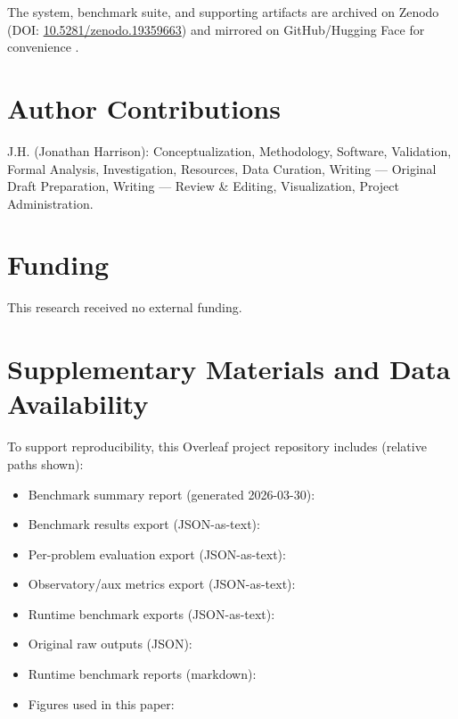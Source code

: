 \documentclass[11pt,a4paper]{article}
\begin{document}
The system, benchmark suite, and supporting artifacts are archived on Zenodo (DOI: \href{https://doi.org/10.5281/zenodo.19359663}{10.5281/zenodo.19359663}) and mirrored on GitHub/Hugging Face for convenience \citep{harrison2026codettezenodo,codetteReasoningWiki,codetteTrainingLab,codetteTrainingLabHF,codetteReasoningHF}.

\section*{Author Contributions}

J.H. (Jonathan Harrison): Conceptualization, Methodology, Software, Validation, Formal Analysis, Investigation, Resources, Data Curation, Writing --- Original Draft Preparation, Writing --- Review \& Editing, Visualization, Project Administration.

\section*{Funding}

This research received no external funding.

\appendix

\section{Supplementary Materials and Data Availability}
\label{app:data}

To support reproducibility, this Overleaf project repository includes (relative paths shown):
{\sloppy
\begin{itemize}[leftmargin=*]
  \item Benchmark summary report (generated 2026-03-30): 
  \item Benchmark results export (JSON-as-text): 
  \item Per-problem evaluation export (JSON-as-text): 
  \item Observatory/aux metrics export (JSON-as-text): 
  \item Runtime benchmark exports (JSON-as-text): 
  \item Original raw outputs (JSON): 
  \item Runtime benchmark reports (markdown): 
  \item Figures used in this paper: 
\end{itemize}
}
\end{document}
